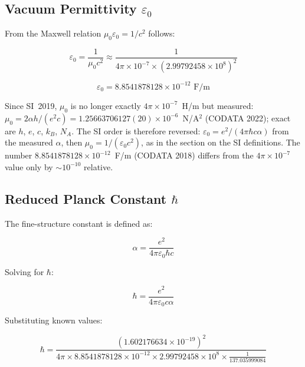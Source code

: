 	\subsection{Vacuum Permittivity $\varepsilon_0$}
	
	From the Maxwell relation $\mu_0 \varepsilon_0 = 1/c^2$ follows:
	
	\begin{equation}
		\varepsilon_0 = \frac{1}{\mu_0 c^2} \approx \frac{1}{4\pi \times 10^{-7} \times (2.99792458 \times 10^8)^2}
	\end{equation}
	
	\begin{tcolorbox}[colback=green!5!white,colframe=green!75!black,title=Vacuum Permittivity]
		\begin{equation}
			\boxed{\varepsilon_0 = 8.8541878128 \times 10^{-12} \text{ F/m}}
		\end{equation}
	\end{tcolorbox}
	
	Since SI~2019, $\mu_0$ is no longer exactly $4\pi\times10^{-7}$~H/m but measured: $\mu_0 = 2\alpha h/(e^2 c) = 1.25663706127(20)\times10^{-6}$~N/A$^2$ (CODATA 2022); exact are $h$, $e$, $c$, $k_B$, $N_A$. The SI order is therefore reversed: $\varepsilon_0 = e^2/(4\pi\hbar c\alpha)$ from the measured $\alpha$, then $\mu_0 = 1/(\varepsilon_0 c^2)$, as in the section on the SI definitions. The number $8.8541878128\times10^{-12}$~F/m (CODATA 2018) differs from the $4\pi\times10^{-7}$ value only by $\sim10^{-10}$ relative.
	
	\subsection{Reduced Planck Constant $\hbar$}
	
	The fine-structure constant is defined as:
	
	\begin{equation}
		\alpha = \frac{e^2}{4\pi\varepsilon_0\hbar c}
	\end{equation}
	
	Solving for $\hbar$:
	
	\begin{equation}
		\hbar = \frac{e^2}{4\pi\varepsilon_0 c \alpha}
	\end{equation}
	
	Substituting known values:
	
	\begin{equation}
		\hbar = \frac{(1.602176634 \times 10^{-19})^2}{4\pi \times 8.8541878128 \times 10^{-12} \times 2.99792458 \times 10^8 \times \frac{1}{137.035999084}}
	\end{equation}
	
